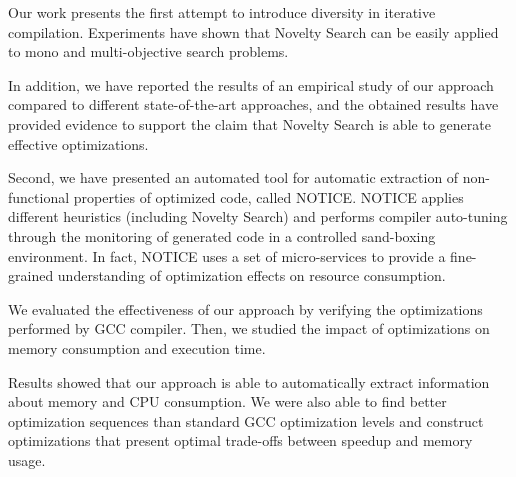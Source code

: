 Our work presents the first attempt to introduce diversity in iterative compilation. Experiments have shown that Novelty Search can be easily applied to mono and multi-objective search problems. 

In addition, we have reported the results of an empirical study of our approach compared to different state-of-the-art approaches, and the obtained results have provided evidence to support the claim that Novelty Search is able to generate effective optimizations.

Second, we have presented an automated tool for automatic extraction of non-functional properties of optimized code, called NOTICE. NOTICE applies different heuristics (including Novelty Search) and performs compiler auto-tuning through the monitoring of generated code in a controlled sand-boxing environment. In fact, NOTICE uses a set of micro-services to provide a fine-grained understanding of optimization effects on resource consumption. 

We evaluated the effectiveness of our approach by verifying the optimizations performed by GCC compiler. Then, we studied the impact of optimizations on memory consumption and execution time.

Results showed that our approach is able to automatically extract information about memory and CPU consumption. We were also able to find better optimization sequences than standard GCC optimization levels and construct optimizations that present optimal trade-offs between speedup and memory usage.





